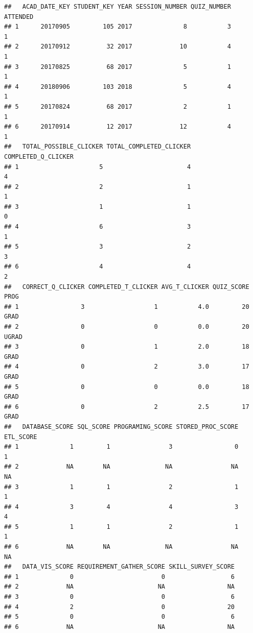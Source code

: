 \documentclass[
]{article}
\begin{document}
\begin{verbatim}
##   ACAD_DATE_KEY STUDENT_KEY YEAR SESSION_NUMBER QUIZ_NUMBER ATTENDED
## 1      20170905         105 2017              8           3        1
## 2      20170912          32 2017             10           4        1
## 3      20170825          68 2017              5           1        1
## 4      20180906         103 2018              5           4        1
## 5      20170824          68 2017              2           1        1
## 6      20170914          12 2017             12           4        1
##   TOTAL_POSSIBLE_CLICKER TOTAL_COMPLETED_CLICKER COMPLETED_Q_CLICKER
## 1                      5                       4                   4
## 2                      2                       1                   1
## 3                      1                       1                   0
## 4                      6                       3                   1
## 5                      3                       2                   3
## 6                      4                       4                   2
##   CORRECT_Q_CLICKER COMPLETED_T_CLICKER AVG_T_CLICKER QUIZ_SCORE  PROG
## 1                 3                   1           4.0         20  GRAD
## 2                 0                   0           0.0         20 UGRAD
## 3                 0                   1           2.0         18  GRAD
## 4                 0                   2           3.0         17  GRAD
## 5                 0                   0           0.0         18  GRAD
## 6                 0                   2           2.5         17  GRAD
##   DATABASE_SCORE SQL_SCORE PROGRAMING_SCORE STORED_PROC_SCORE ETL_SCORE
## 1              1         1                3                 0         1
## 2             NA        NA               NA                NA        NA
## 3              1         1                2                 1         1
## 4              3         4                4                 3         4
## 5              1         1                2                 1         1
## 6             NA        NA               NA                NA        NA
##   DATA_VIS_SCORE REQUIREMENT_GATHER_SCORE SKILL_SURVEY_SCORE
## 1              0                        0                  6
## 2             NA                       NA                 NA
## 3              0                        0                  6
## 4              2                        0                 20
## 5              0                        0                  6
## 6             NA                       NA                 NA
\end{verbatim}
\end{document}
